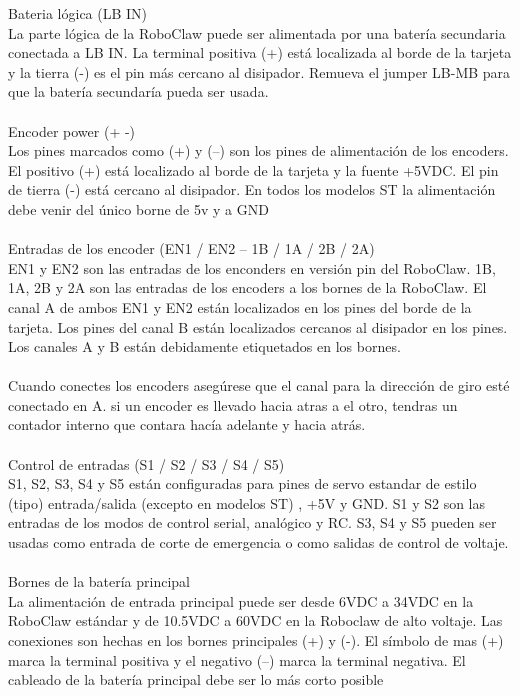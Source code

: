 \documentclass[a4paper]{book}
\begin{document}
Bateria lógica (LB IN)\\
La parte lógica de la RoboClaw puede ser alimentada por una batería secundaria conectada a LB IN. La terminal positiva
(+) está localizada al borde de la tarjeta y la tierra (-) es el pin más cercano al disipador. Remueva el jumper LB-MB
para que la batería secundaría pueda ser usada.\\
\\
Encoder power (+ -)\\
Los pines marcados como (+) y (–) son los pines de alimentación  de los encoders. El positivo (+) está localizado al
borde de la tarjeta y la fuente +5VDC. El pin de tierra (-) está cercano al disipador. En todos los modelos ST la
alimentación debe venir del único borne de 5v  y a GND\\
\\
Entradas de los encoder (EN1 / EN2 – 1B / 1A / 2B / 2A)\\ 
EN1 y EN2 son las entradas de los enconders en versión pin del RoboClaw. 1B, 1A, 2B y 2A son las entradas de los encoders
a los bornes de la RoboClaw. El canal A de ambos EN1 y EN2 están localizados en los pines del borde de la tarjeta.
Los pines del canal B están localizados cercanos al disipador en los pines. Los canales A y B están debidamente etiquetados
en los bornes.\\
\\
Cuando conectes los encoders asegúrese que el canal para la dirección de giro esté conectado en A. si un encoder es
llevado hacia atras a el otro, tendras un contador interno que contara hacía adelante y hacia atrás. \\
\\
Control de entradas (S1 / S2 / S3 / S4 / S5)\\
S1, S2, S3, S4 y S5 están configuradas para pines de servo estandar de estilo (tipo) entrada/salida (excepto en modelos ST)
, +5V y GND. S1 y S2 son las entradas  de los modos de control serial, analógico y RC. S3, S4 y S5 pueden ser usadas como
entrada de corte de emergencia o como salidas de control de voltaje.\\
\\
Bornes de la batería principal\\
La alimentación de entrada principal puede ser desde 6VDC a 34VDC en la RoboClaw estándar y de 10.5VDC a 60VDC en la Roboclaw
de alto voltaje. Las conexiones son hechas en los bornes principales (+) y (-). El símbolo de mas (+) marca la terminal
positiva y el negativo (–) marca la terminal negativa. El cableado de la batería principal debe ser lo más corto posible \\
\end{document}
